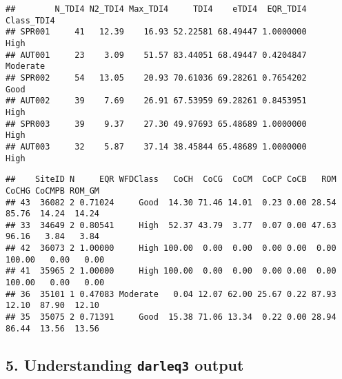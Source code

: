 \documentclass[]{article}
\newenvironment{Shaded}{\begin{snugshade}}{\end{snugshade}}
\newcommand{\KeywordTok}[1]{\textcolor[rgb]{0.13,0.29,0.53}{\textbf{#1}}}
\newcommand{\DataTypeTok}[1]{\textcolor[rgb]{0.13,0.29,0.53}{#1}}
\newcommand{\DecValTok}[1]{\textcolor[rgb]{0.00,0.00,0.81}{#1}}
\newcommand{\StringTok}[1]{\textcolor[rgb]{0.31,0.60,0.02}{#1}}
\newcommand{\OperatorTok}[1]{\textcolor[rgb]{0.81,0.36,0.00}{\textbf{#1}}}
\newcommand{\NormalTok}[1]{#1}
\begin{document}
\begin{Shaded}
\end{Shaded}

\begin{verbatim}
##        N_TDI4 N2_TDI4 Max_TDI4     TDI4    eTDI4  EQR_TDI4 Class_TDI4
## SPR001     41   12.39    16.93 52.22581 68.49447 1.0000000       High
## AUT001     23    3.09    51.57 83.44051 68.49447 0.4204847   Moderate
## SPR002     54   13.05    20.93 70.61036 69.28261 0.7654202       Good
## AUT002     39    7.69    26.91 67.53959 69.28261 0.8453951       High
## SPR003     39    9.37    27.30 49.97693 65.48689 1.0000000       High
## AUT003     32    5.87    37.14 38.45844 65.48689 1.0000000       High
\end{verbatim}

\begin{Shaded}
\end{Shaded}

\begin{verbatim}
##    SiteID N     EQR WFDClass   CoCH  CoCG  CoCM  CoCP CoCB   ROM  CoCHG CoCMPB ROM_GM
## 43  36082 2 0.71024     Good  14.30 71.46 14.01  0.23 0.00 28.54  85.76  14.24  14.24
## 33  34649 2 0.80541     High  52.37 43.79  3.77  0.07 0.00 47.63  96.16   3.84   3.84
## 42  36073 2 1.00000     High 100.00  0.00  0.00  0.00 0.00  0.00 100.00   0.00   0.00
## 41  35965 2 1.00000     High 100.00  0.00  0.00  0.00 0.00  0.00 100.00   0.00   0.00
## 36  35101 1 0.47083 Moderate   0.04 12.07 62.00 25.67 0.22 87.93  12.10  87.90  12.10
## 35  35075 2 0.71391     Good  15.38 71.06 13.34  0.22 0.00 28.94  86.44  13.56  13.56
\end{verbatim}

\subsection{\texorpdfstring{5. Understanding \texttt{darleq3}
output}{5. Understanding darleq3 output}}\label{understanding-darleq3-output}
\end{document}
